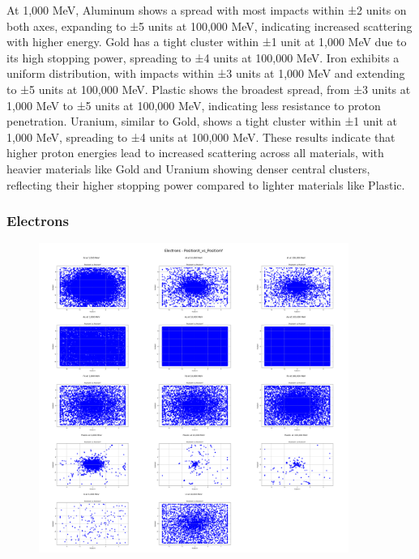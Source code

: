 \documentclass{article}
\begin{document}
\noindent At 1,000 MeV, Aluminum shows a spread with most impacts within ±2 units on both axes, expanding to ±5 units at 100,000 MeV, indicating increased scattering with higher energy. Gold has a tight cluster within ±1 unit at 1,000 MeV due to its high stopping power, spreading to ±4 units at 100,000 MeV. Iron exhibits a uniform distribution, with impacts within ±3 units at 1,000 MeV and extending to ±5 units at 100,000 MeV. Plastic shows the broadest spread, from ±3 units at 1,000 MeV to ±5 units at 100,000 MeV, indicating less resistance to proton penetration. Uranium, similar to Gold, shows a tight cluster within ±1 unit at 1,000 MeV, spreading to ±4 units at 100,000 MeV. These results indicate that higher proton energies lead to increased scattering across all materials, with heavier materials like Gold and Uranium showing denser central clusters, reflecting their higher stopping power compared to lighter materials like Plastic.

\subsubsection{Electrons}

\begin{figure}[H]
\centering
\includegraphics[width=0.9\textwidth]{images/Combined Plots/PositionX_vs_PositionY_e-.png}
\end{figure}\
\end{document}
